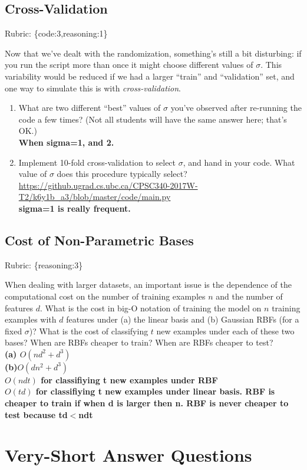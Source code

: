 \documentclass{article}
\def\rubric#1{\gre{Rubric: \{#1\}}}{}
\def\blu#1{{\color{blu}#1}}
\def\gre#1{{\color{gre}#1}}
\def\enum#1{\begin{enumerate}#1\end{enumerate}}
\begin{document}
\subsection{Cross-Validation}
\rubric{code:3,reasoning:1}

Now that we've dealt with the randomization, something's still a bit disturbing:
if you run the script more than once it might choose different values of $\sigma$.
This variability would be reduced if we
had a larger ``train'' and ``validation'' set, and one way to simulate this is
with \emph{cross-validation}. 

\blu{\enum{
\item What are two different ``best'' values of $\sigma$ you've observed after re-running the code a few times? (Not all students will have the same answer here; that's OK.)\\
\textbf{When sigma=1, and 2.}
\item Implement 10-fold cross-validation to select $\sigma$, and hand in your code. What value of $\sigma$ does this procedure typically select?\\
\url{https://github.ugrad.cs.ubc.ca/CPSC340-2017W-T2/k6y1b_a3/blob/master/code/main.py}\\
\textbf{sigma=1 is really frequent.}
}}


\subsection{Cost of Non-Parametric Bases}
\rubric{reasoning:3}

When dealing with larger datasets, an important issue is the dependence of the
computational cost on the number of training examples $n$ and the number of
features $d$. \blu{What is the cost in big-O notation of training the model
on $n$ training examples with $d$ features under (a) the linear basis and
(b) Gaussian RBFs (for a fixed $\sigma$)? What is the cost of
classifying $t$ new examples under each of these two bases? When are RBFs
cheaper to train? When are RBFs cheaper to test?}
\\\textbf{(a) $O(nd^2+d^3)$\\
(b)$O(dn^2+d^3)$\\
$O(ndt)$ for classifiying t new examples under RBF\\
$O(td)$ for classifiying t new examples under linear basis.
RBF is cheaper to train if when d is larger then n.
RBF is never cheaper to test because td$<$ndt}


\section{Very-Short Answer Questions}
\end{document}
